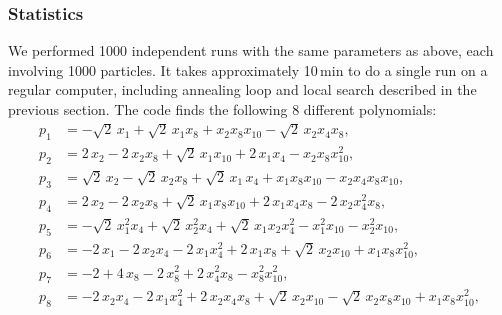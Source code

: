 \documentclass[11pt,a4paper]{article}
\begin{document}
	\subsubsection{Statistics}
	We performed 1000 independent runs with the same parameters as above, each involving 1000 particles. It takes approximately 10\,min to do a single run on a regular computer, including annealing loop and local search described in the previous section. The code finds the following 8 different polynomials:
	\begin{subequations} \label{eq:pols}
	 \begin{align}
	   p_{1} &= -\sqrt{2}\,x_{1} + \sqrt{2}\,x_{1}x_8 + x_{2}x_8x_{10} - \sqrt{2}\,x_{2}x_{4}x_8,\\[4pt]
	   p_{2} &= 2\,x_{2} - 2\,x_{2}x_8 + \sqrt{2}\,x_{1}x_{10} + 2\,x_{1}x_{4} - x_{2}x_8x_{10}^{2},\\[4pt]
	   p_{3} &= \sqrt{2}\,x_{2} - \sqrt{2}\,x_{2}x_8 + \sqrt{2}\,x_{1}\,x_{4} + x_{1}x_8x_{10}
	   		- x_{2}x_{4}x_8x_{10},\\[4pt]
	   p_{4} &= 2\,x_{2} - 2\,x_{2}x_8 + \sqrt{2}\,x_{1}x_8x_{10} + 2\,x_{1}x_{4}x_8
	   		- 2\,x_{2} x_{4}^{2}x_8,\\[4pt]
	   p_{5} &= -\sqrt{2}\,x_{1}^{2}x_{4} + \sqrt{2}\,x_{2}^{2}x_{4} + \sqrt{2}\,x_{1}x_{2}x_{4}^{2} - x_{1}^{2}x_{10}
	   		- x_{2}^{2}x_{10}, \\[4pt]
	   p_{6} &= -2\,x_{1} - 2\,x_{2}x_{4}- 2\,x_{1}x_{4}^{2} + 2\,x_{1}x_8 + \sqrt{2}\,x_{2}x_{10}
	   		+ x_{1}x_8x_{10}^{2},\\[4pt]
	   p_{7} &= -2 + 4\,x_{8} - 2\,x_8^2 + 2\,x_{4}^2 x_8 - x_8^2 x_{10}^2,\\[4pt]
	   p_{8} &= -2\,x_{2}x_{4} - 2\,x_{1}x_{4}^{2} + 2\,x_{2}x_{4}x_8 + \sqrt{2}\,x_{2}x_{10} 
	   		- \sqrt{2}\,x_{2}x_8x_{10} +  x_{1}x_8x_{10}^{2},
	 \end{align}
	\end{subequations}
\end{document}

